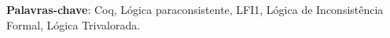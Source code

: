 
\setlength{\absparsep}{18pt} %
\begin{resumo}
   
 \textbf{Palavras-chave}: Coq, Lógica paraconsistente, LFI1, Lógica de Inconsistência Formal, Lógica Trivalorada.
\end{resumo}
